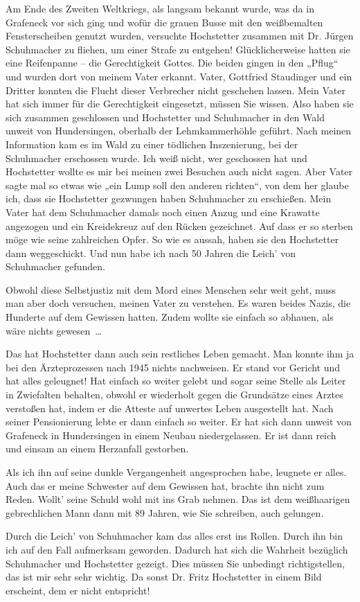 Am Ende des Zweiten Weltkriegs, als langsam bekannt wurde, was da in Grafeneck vor sich ging und
wofür die grauen Busse mit den weißbemalten %
Fensterscheiben genutzt wurden,
versuchte Hochstetter zusammen mit Dr. Jürgen Schuhmacher zu fliehen, um einer Strafe zu entgehen!
Glücklicherweise hatten sie eine Reifenpanne – die Gerechtigkeit Gottes. Die beiden gingen in den
„Pflug“ und wurden dort von meinem Vater erkannt. Vater, Gottfried Staudinger und ein Dritter
konnten die Flucht dieser Verbrecher nicht geschehen lassen. Mein Vater hat sich immer für die
Gerechtigkeit eingesetzt, müssen Sie wissen. Also haben sie sich zusammen geschlossen und
Hochstetter und Schuhmacher in den Wald unweit von Hundersingen, oberhalb der Lehmkammerhöhle
geführt. Nach meinen Information kam es im Wald zu einer tödlichen Inszenierung, bei der Schuhmacher
erschossen wurde. Ich weiß nicht, wer geschossen hat und Hochstetter wollte es mir bei meinen zwei
Besuchen auch nicht sagen. Aber Vater sagte mal so etwas wie „ein Lump soll den anderen richten“,
von dem her glaube ich, dass sie Hochstetter gezwungen haben Schuhmacher zu erschießen. Mein Vater
hat dem Schuhmacher damals noch einen Anzug und eine Krawatte angezogen und ein Kreidekreuz auf den
Rücken gezeichnet. Auf dass er so sterben möge wie seine zahlreichen Opfer. So wie es aussah, haben
sie den Hochstetter dann weggeschickt. Und nun habe ich nach 50 Jahren die Leich’ von Schuhmacher
gefunden.

Obwohl diese Selbstjustiz mit dem Mord eines Menschen sehr weit geht, muss man aber doch versuchen,
meinen Vater zu verstehen. Es waren beides Nazis, die Hunderte auf dem Gewissen hatten. Zudem wollte
sie einfach so abhauen, als wäre nichts gewesen~…

Das hat Hochstetter dann auch sein restliches Leben gemacht. Man konnte ihm ja bei den
Ärzteprozessen nach 1945 nichts nachweisen. Er stand vor Gericht und hat alles geleugnet! Hat
einfach so weiter gelebt und sogar seine Stelle als Leiter in Zwiefalten behalten, obwohl er
wiederholt gegen die Grundsätze eines Arztes verstoßen hat, indem er die Atteste auf unwertes Leben
ausgestellt hat. Nach seiner Pensionierung lebte er dann einfach so weiter. Er hat sich dann unweit
von Grafeneck in Hundersingen in einem Neubau niedergelassen. Er ist dann reich und einsam an einem
Herzanfall gestorben.

Als ich ihn auf seine dunkle Vergangenheit angesprochen habe, leugnete er alles. Auch das er meine
Schwester auf dem Gewissen hat, brachte ihn nicht zum Reden. Wollt’ seine Schuld wohl mit ins Grab
nehmen. Das ist dem weißhaarigen gebrechlichen Mann dann mit 89 Jahren, %
wie Sie schreiben, auch gelungen.

Durch die Leich’ von Schuhmacher kam das alles erst ins Rollen. Durch ihn bin ich auf den Fall
aufmerksam geworden. Dadurch hat sich die Wahrheit bezüglich Schuhmacher und Hochstetter gezeigt.
Dies müssen Sie unbedingt richtigstellen, das ist mir sehr sehr wichtig. Da sonst Dr. Fritz
Hochstetter in einem Bild erscheint, dem er nicht entspricht!
